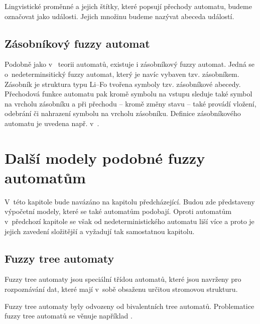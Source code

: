 \begin{notation}
 Lingvistické proměnné a jejich štítky, které popsují přechody automatu, budeme označovat jako události. Jejich množinu budeme nazývat abeceda událostí.
\end{notation}

\subsection{Zásobníkový fuzzy automat}
Podobně jako v~ teorii automatů, existuje i zásobníkový fuzzy automat. Jedná se o~nedeterminsitický fuzzy automat, který je navíc vybaven tzv. zásobníkem. Zásobník je struktura typu Li--Fo tvořena symboly tzv. zásobníkové abecedy. Přechodová funkce automatu pak kromě symbolu na vstupu sleduje také symbol na vrcholu zásobníku a při přechodu -- kromě změny stavu -- také provádí vložení, odebrání či nahrazení symbolu na vrcholu zásobníku. Definice zásobníkového automatu je uvedena např. v~\cite{BucPas-FuzPusAut}.

\section{Další modely podobné fuzzy automatům}
V~této kapitole bude navázáno na kapitolu předcházející. Budou zde představeny výpočetní modely, které se také automatům podobají. Oproti automatům v~předchozí kapitole se však od  nedeterministického automatu liší více a proto je jejich zavedení složitější a vyžadují tak samostatnou kapitolu.


\subsection{Fuzzy tree automaty}
Fuzzy tree automaty jsou speciální třídou automatů, které jsou navrženy pro rozpoznávání dat, které mají v~sobě obsaženu určitou stromovou strukturu.

Fuzzy tree automaty byly odvozeny od  bivalentních tree automatů. Problematice fuzzy tree automatů se věnuje například \cite{Lee-FuzTreAutSynPatRec, MogZadAme-NewDirInFuzzTreeAut,ChaJos-NoteFuzzTreeAut, EsiLiu-FuzzTreeAut, MorMal-FuzzyAutLang}.

